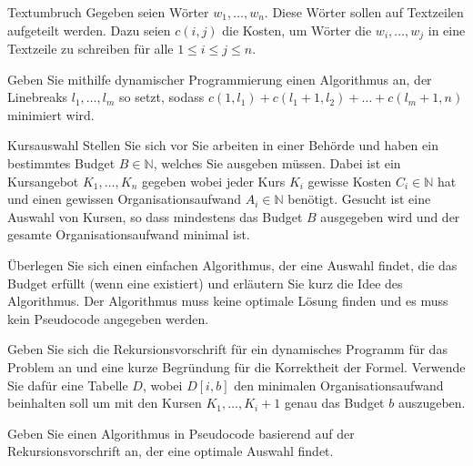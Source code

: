\documentclass{exercisesheet}
\begin{document}
\begin{exercise}{Textumbruch}
  Gegeben seien Wörter $w_1, \ldots, w_n$. Diese Wörter sollen auf Textzeilen aufgeteilt werden. Dazu seien $c(i, j)$ die Kosten, um Wörter die $w_i, \ldots, w_j$ in eine Textzeile zu schreiben für alle $1 \leq i \leq j \leq n$.\par
  Geben Sie mithilfe dynamischer Programmierung einen Algorithmus an, der Linebreaks $l_1, \ldots, l_m$ so setzt, sodass $c(1,l_1)+c(l_1 +1,l_2)+\ldots+c(l_m +1,n)$ minimiert wird.
\end{exercise}

\begin{eexercises}{Kursauswahl}{
    Stellen Sie sich vor Sie arbeiten in einer Behörde und haben ein bestimmtes Budget $B \in \mathbb{N}$, welches Sie ausgeben müssen. Dabei ist ein Kursangebot $K_1, \ldots, K_n$ gegeben wobei jeder Kurs $K_i$ gewisse Kosten $C_i \in \mathbb{N}$ hat und einen gewissen Organisationsaufwand $A_i \in \mathbb{N}$ benötigt. Gesucht ist eine Auswahl von Kursen, so dass mindestens das Budget $B$ ausgegeben wird und der gesamte Organisationsaufwand minimal ist.
  }
  \item Überlegen Sie sich einen einfachen Algorithmus, der eine Auswahl findet, die das Budget erfüllt (wenn eine existiert) und erläutern Sie kurz die Idee des Algorithmus. Der Algorithmus muss keine optimale Lösung finden und es muss kein Pseudocode angegeben werden.
  \item Geben Sie sich die Rekursionsvorschrift für ein dynamisches Programm für das Problem an und eine kurze Begründung für die Korrektheit der Formel. Verwende Sie dafür eine Tabelle $D$, wobei $D[i, b]$ den minimalen Organisationsaufwand beinhalten soll um mit den Kursen $K_1, \ldots, K_i+1$ genau das Budget $b$ auszugeben.
  \item Geben Sie einen Algorithmus in Pseudocode basierend auf der Rekursionsvorschrift an, der eine optimale Auswahl findet.
\end{eexercises}
\end{document}
